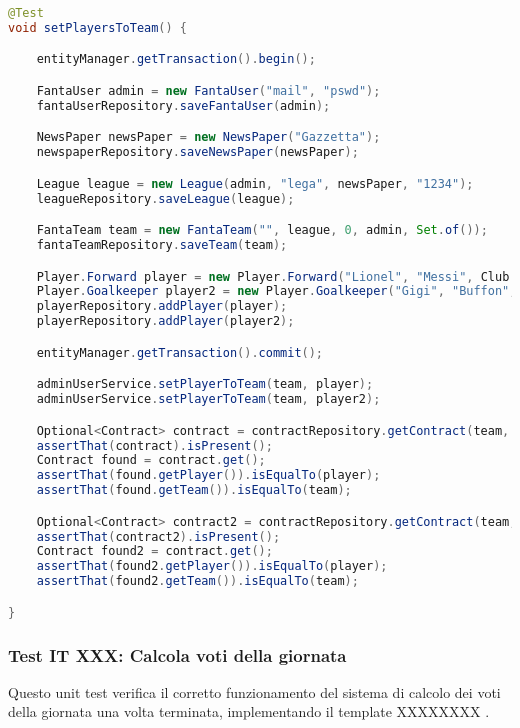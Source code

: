 \begin{lstlisting}[language=Java]
@Test
void setPlayersToTeam() {

	entityManager.getTransaction().begin();

    FantaUser admin = new FantaUser("mail", "pswd");
	fantaUserRepository.saveFantaUser(admin);

    NewsPaper newsPaper = new NewsPaper("Gazzetta");
	newspaperRepository.saveNewsPaper(newsPaper);

    League league = new League(admin, "lega", newsPaper, "1234");
	leagueRepository.saveLeague(league);

	FantaTeam team = new FantaTeam("", league, 0, admin, Set.of());
	fantaTeamRepository.saveTeam(team);

	Player.Forward player = new Player.Forward("Lionel", "Messi", Club.CREMONESE);
	Player.Goalkeeper player2 = new Player.Goalkeeper("Gigi", "Buffon", Club.JUVENTUS);
	playerRepository.addPlayer(player);
	playerRepository.addPlayer(player2);

	entityManager.getTransaction().commit();

	adminUserService.setPlayerToTeam(team, player);
	adminUserService.setPlayerToTeam(team, player2);

	Optional<Contract> contract = contractRepository.getContract(team, player);
	assertThat(contract).isPresent();
	Contract found = contract.get();
	assertThat(found.getPlayer()).isEqualTo(player);
	assertThat(found.getTeam()).isEqualTo(team);

    Optional<Contract> contract2 = contractRepository.getContract(team, player);
	assertThat(contract2).isPresent();
	Contract found2 = contract.get();
	assertThat(found2.getPlayer()).isEqualTo(player);
	assertThat(found2.getTeam()).isEqualTo(team);

}
\end{lstlisting}


\subsubsection{Test IT XXX: Calcola voti della giornata}

Questo unit test verifica il corretto funzionamento del sistema di calcolo dei voti della giornata una volta terminata,
implementando il template XXXXXXXX .

